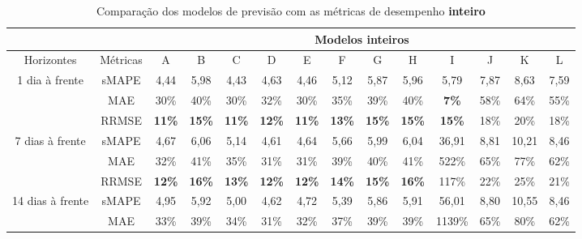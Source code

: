 \begin{landscape}
\begin{table}[htpb!]
	\centering
	\caption{Comparação dos modelos de previsão com as métricas de desempenho \textbf{inteiro}}\label{tb:apd-int}
	\begin{tabular}{@{}cccccccccccccc@{}}
		\toprule
		&          & \multicolumn{12}{c}{Modelos inteiros}                                                                                                                               \\ \midrule
		Horizontes                        & Métricas & A             & B             & C             & D             & E             & F             & G             & H             & I             & J    & K     & L    \\ \midrule
		\multirow{3}{*}{1 dia à frente}   & sMAPE    & 4,44          & 5,98          & 4,43          & 4,63          & 4,46          & 5,12          & 5,87          & 5,96          & 5,79          & 7,87 & 8,63  & 7,59 \\
		& MAE      & 30\%          & 40\%          & 30\%          & 32\%          & 30\%          & 35\%          & 39\%          & 40\%          & \textbf{7\%}  & 58\% & 64\%  & 55\% \\
		& RRMSE    & \textbf{11\%} & \textbf{15\%} & \textbf{11\%} & \textbf{12\%} & \textbf{11\%} & \textbf{13\%} & \textbf{15\%} & \textbf{15\%} & \textbf{15\%} & 18\% & 20\%  & 18\% \\ \midrule
		\multirow{3}{*}{7 dias à frente}  & sMAPE    & 4,67          & 6,06          & 5,14          & 4,61          & 4,64          & 5,66          & 5,99          & 6,04          & 36,91         & 8,81 & 10,21 & 8,46 \\
		& MAE      & 32\%          & 41\%          & 35\%          & 31\%          & 31\%          & 39\%          & 40\%          & 41\%          & 522\%         & 65\% & 77\%  & 62\% \\
		& RRMSE    & \textbf{12\%} & \textbf{16\%} & \textbf{13\%} & \textbf{12\%} & \textbf{12\%} & \textbf{14\%} & \textbf{15\%} & \textbf{16\%} & 117\%         & 22\% & 25\%  & 21\% \\ \midrule
		\multirow{3}{*}{14 dias à frente} & sMAPE    & 4,95          & 5,92          & 5,00          & 4,62          & 4,72          & 5,39          & 5,86          & 5,91          & 56,01         & 8,80 & 10,55 & 8,46 \\
		& MAE      & 33\%          & 39\%          & 34\%          & 31\%          & 32\%          & 37\%          & 39\%          & 39\%          & 1139\%        & 65\% & 80\%  & 62\% \\

\end{tabular}
\end{table}
\end{landscape}
